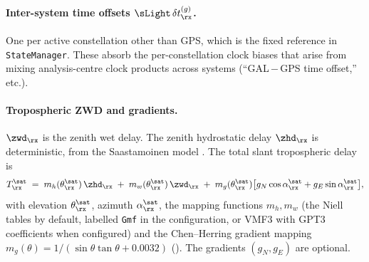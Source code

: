 \paragraph{Inter-system time offsets $\sLight\,\delta t^{(g)}_\rx$.}
One per active constellation other than GPS, which is the fixed
reference in \texttt{StateManager}.  These absorb the per-constellation
clock biases that arise from mixing analysis-centre clock products across
systems (``GAL\,$-$\,GPS time offset,'' etc.).

\paragraph{Tropospheric ZWD and gradients.}
$\zwd_\rx$ is the zenith wet delay.  The zenith hydrostatic delay
$\zhd_\rx$ is deterministic, from the Saastamoinen model
\cite{saastamoinen1972atmospheric}.  The total slant tropospheric delay
is
\begin{equation}
T^\sat_\rx \;=\;
m_h(\theta^\sat_\rx)\,\zhd_\rx
\;+\;
m_w(\theta^\sat_\rx)\,\zwd_\rx
\;+\;
m_g(\theta^\sat_\rx) \big[
g_N \cos\alpha^\sat_\rx + g_E \sin\alpha^\sat_\rx
\big],
\label{eq:tropo-mapping}
\end{equation}
with elevation $\theta^\sat_\rx$, azimuth $\alpha^\sat_\rx$, the mapping
functions $m_h, m_w$ (the Niell tables by default, labelled \texttt{Gmf}
in the configuration, or VMF3 with GPT3 coefficients when configured) and
the Chen--Herring gradient mapping
$m_g(\theta) = 1/(\sin\theta\tan\theta + 0.0032)$
\cite{chen1997effects}
().  The gradients $(g_N, g_E)$
are optional.

